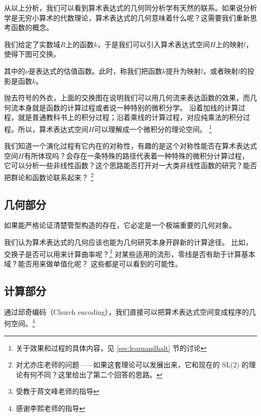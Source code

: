 \documentclass[a4paper,12pt]{article}
\numberwithin{problem}{section}
\numberwithin{definition}{section}
\numberwithin{lemma}{section}
\numberwithin{proposition}{section}
\numberwithin{theorem}{section}
\numberwithin{grammar}{section}
\numberwithin{program}{section}
\numberwithin{convention}{section}
\numberwithin{corollary}{section}
\begin{document}
从以上分析，我们可以看到算术表达式的几何同分析学有天然的联系。如果说分析学是无穷小算术的代数理论，算术表达式的几何意味着什么呢？这需要我们重新思考函数的概念。

我们给定了实数域$R$上的函数$k$，于是我们可以引入算术表达式空间$H$上的映射$l$，使得下图可交换。

\begin{center}
\end{center}

其中的$\nu$是表达式的估值函数。此时，称我们把函数$k$提升为映射$l$，或者映射$l$的投影是函数$k$。

抛去符号的外衣，上面的交换图在说明我们可以用几何流来表达函数的效果，而几何流本身就是函数的计算过程或者说一种特别的微积分学。
沿着加线的计算过程，就是普通教科书上的积分过程；沿着乘线的计算过程，对应纯乘法的积分过程。所以，算术表达式空间$H$可以理解成一个微积分的理论空间。
\footnote{关于效果和过程的具体内容，见 \ref{sec:learnandhalt} 节的讨论}

我们知道一个演化过程有它内在的对称性，有趣的是这个对称性能否在算术表达式空间$H$有所体现吗？会存在一条特殊的路径代表着一种特殊的微积分计算过程，
它可以分析一些非线性函数？这个思路能否打开对一大类非线性函数的研究？能否把群论和函数论联系起来？
\footnote{对尤亦庄老师的问题——如果这套理论可以发展出来，它和现在的 SL(2) 的理论有何不同？这里给出了第二个回答的思路。}

\subsection{几何部分}

如果能严格论证清楚管型构造的存在，它必定是一个极端重要的几何对象。

我们认为算术表达式的几何应该也能为几何研究本身开辟新的计算途径。
比如，交换子是否可以用来计算曲率呢？\footnote{受教于蒋文峰老师的指导}
对某些适用的流形，零线是否有助于计算基本域？能否用来做单值化呢？
这些都是可以看到的可能性。

\subsection{计算部分}

通过邱奇编码（Church encoding），我们直接可以把算术表达式空间变成程序的几何空间。\footnote{感谢李熙老师的指导}
\end{document}
